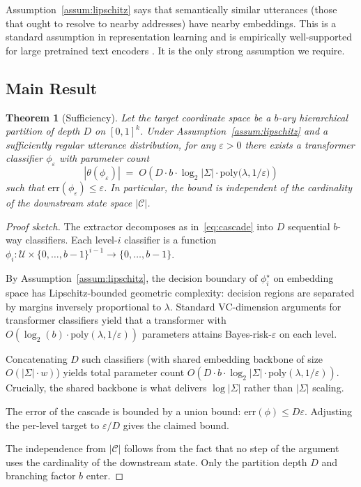 \documentclass[11pt,a4paper]{article}
\newtheorem{theorem}{Theorem}[section]
\theoremstyle{definition}
\theoremstyle{remark}
\newcommand{\Cc}{\mathcal{C}}
\newcommand{\Uc}{\mathcal{U}}
\begin{document}
Assumption~\ref{assum:lipschitz} says that semantically similar utterances (those that ought to resolve to nearby addresses) have nearby embeddings. This is a standard assumption in representation learning and is empirically well-supported for large pretrained text encoders \citep{reimers2019sentencebert}. It is the only strong assumption we require.

\subsection{Main Result}

\begin{theorem}[Sufficiency]
\label{thm:sufficiency}
Let the target coordinate space be a $b$-ary hierarchical partition of depth $D$ on $[0,1]^k$. Under Assumption~\ref{assum:lipschitz} and a sufficiently regular utterance distribution, for any $\varepsilon > 0$ there exists a transformer classifier $\phi_\varepsilon$ with parameter count
\[
|\theta(\phi_\varepsilon)| \;=\; O\!\left( D \cdot b \cdot \log_2 |\Sigma| \cdot \mathrm{poly}\bigl(\lambda, 1/\varepsilon\bigr) \right)
\]
such that $\mathrm{err}(\phi_\varepsilon) \leq \varepsilon$. In particular, the bound is independent of the cardinality of the downstream state space $|\Cc|$.
\end{theorem}

\begin{proof}[Proof sketch]
The extractor decomposes as in~\eqref{eq:cascade} into $D$ sequential $b$-way classifiers. Each level-$i$ classifier is a function $\phi_i: \Uc \times \{0,\ldots,b-1\}^{i-1} \to \{0,\ldots,b-1\}$.

By Assumption~\ref{assum:lipschitz}, the decision boundary of $\phi_i^\star$ on embedding space has Lipschitz-bounded geometric complexity: decision regions are separated by margins inversely proportional to $\lambda$. Standard VC-dimension arguments for transformer classifiers \citep{bartlett2017vcbound, edelman2022transformers} yield that a transformer with $O(\log_2(b) \cdot \mathrm{poly}(\lambda, 1/\varepsilon))$ parameters attains Bayes-risk-$\varepsilon$ on each level.

Concatenating $D$ such classifiers (with shared embedding backbone of size $O(|\Sigma| \cdot w)$) yields total parameter count $O(D \cdot b \cdot \log_2 |\Sigma| \cdot \mathrm{poly}(\lambda, 1/\varepsilon))$. Crucially, the shared backbone is what delivers $\log |\Sigma|$ rather than $|\Sigma|$ scaling.

The error of the cascade is bounded by a union bound: $\mathrm{err}(\phi) \leq D \varepsilon$. Adjusting the per-level target to $\varepsilon/D$ gives the claimed bound.

The independence from $|\Cc|$ follows from the fact that no step of the argument uses the cardinality of the downstream state. Only the partition depth $D$ and branching factor $b$ enter.
\end{proof}
\end{document}

